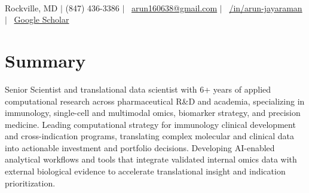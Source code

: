 \documentclass[letterpaper,11pt]{article}
\begin{document}
{\raggedright
{\Huge\bfseries\color{primarycolor}{Arun Jayaraman}} \\[4pt]
\faMapMarker* Rockville, MD $\vert$ \faPhone* (847) 436-3386 $\vert$ \faEnvelope \ \href{mailto:arun160638@gmail.com}{arun160638@gmail.com} $\vert$ \faLinkedin \ \href{https://linkedin.com/in/arun-jayaraman}{/in/arun-jayaraman} $\vert$ \faGraduationCap \ \href{https://scholar.google.com/citations?user=9L9vIUcAAAAJ}{Google Scholar}
\par}

\section*{Summary}
Senior Scientist and translational data scientist with 6+ years of applied computational research across pharmaceutical R\&D and academia, specializing in immunology, single-cell and multimodal omics, biomarker strategy, and precision medicine. Leading computational strategy for immunology clinical development and cross-indication programs, translating complex molecular and clinical data into actionable investment and portfolio decisions. Developing AI-enabled analytical workflows and tools that integrate validated internal omics data with external biological evidence to accelerate translational insight and indication prioritization.

\end{document}

